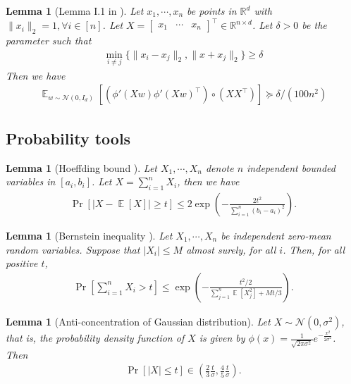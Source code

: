 \documentclass[11pt]{article}
\DeclareMathOperator*{\E}{\mathbb{E}}
\newcommand{\N}{\mathcal{N}}
\newcommand{\R}{\mathbb{R}}
\newtheorem{lemma}[theorem]{Lemma}
\begin{document}
\begin{lemma}[Lemma I.1 in \cite{os20}]
Let $x_1, \cdots, x_n$ be points in $\R^d$ with $\| x_i \|_2 = 1, \forall i \in [n]$. Let $X = \begin{bmatrix} x_1 & \cdots & x_n \end{bmatrix}^\top \in \R^{n \times d}$. Let $\delta > 0 $ be the parameter such that
\begin{align*}
    \min_{i \neq j} \{ \| x_i - x_j \|_2 , \| x + x_j \|_2  \} \geq \delta
\end{align*}
Then we have
\begin{align*}
    \E_{w \sim \N (0,I_d)} [ ( \phi'(X w) \phi'(X w)^\top ) \circ ( X X^\top ) ] \succeq \delta / (100 n^2)
\end{align*}
\end{lemma}

\subsection{Probability tools}


\begin{lemma}[Hoeffding bound \cite{h63}]\label{lem:hoeffding}
Let $X_1, \cdots, X_n$ denote $n$ independent bounded variables in $[a_i,b_i]$. Let $X= \sum_{i=1}^n X_i$, then we have
\begin{align*}
\Pr[ | X - \E[X] | \geq t ] \leq 2\exp \left( - \frac{2t^2}{ \sum_{i=1}^n (b_i - a_i)^2 } \right).
\end{align*}
\end{lemma}

\begin{lemma}[Bernstein inequality \cite{b24}]\label{lem:bernstein}
Let $X_1, \cdots, X_n$ be independent zero-mean random variables. Suppose that $|X_i| \leq M$ almost surely, for all $i$. Then, for all positive $t$,
\begin{align*}
\Pr \left[ \sum_{i=1}^n X_i > t \right] \leq \exp \left( - \frac{ t^2/2 }{ \sum_{j=1}^n \E[X_j^2]  + M t /3 } \right).
\end{align*}
\end{lemma}

\begin{lemma}[Anti-concentration of Gaussian distribution]\label{lem:anti_gaussian}
Let $X\sim {\N}(0,\sigma^2)$,
that is,
the probability density function of $X$ is given by $\phi(x)=\frac 1 {\sqrt{2\pi\sigma^2}}e^{-\frac {x^2} {2\sigma^2} }$.
Then
\begin{align*}
    \Pr[|X|\leq t]\in \left( \frac 2 3\frac t \sigma, \frac 4 5\frac t \sigma \right).
\end{align*}
\end{lemma}




\end{document}
